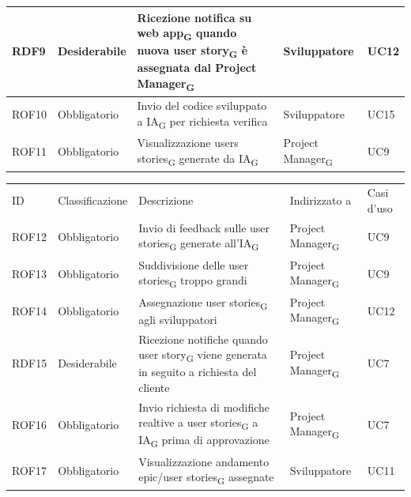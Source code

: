 \documentclass{article}
\begin{document}
\begin{center}
\begin{tabular}{|p{2cm}|p{3cm}|p{6cm}|p{3cm}|p{2cm}|}
RDF9&Desiderabile & Ricezione notifica su web app\textsubscript{G} quando nuova user story\textsubscript{G} è assegnata dal Project Manager\textsubscript{G}& Sviluppatore & UC12\\
\hline
\rowcolor{LighterBlue}
ROF10&Obbligatorio & Invio del codice sviluppato a IA\textsubscript{G} per richiesta verifica& Sviluppatore & UC15\\

\hline
\rowcolor{LightBlue}

ROF11&Obbligatorio & Visualizzazione users stories\textsubscript{G} generate da IA\textsubscript{G}  & Project Manager\textsubscript{G} & UC9\\
\hline


\end{tabular}

    \begin{tabular}{|p{2cm}|p{3cm}|p{6cm}|p{3cm}|p{2cm}|}
    \rowcolor{Blue} 
\hline
ID & Classificazione & Descrizione & Indirizzato a&Casi d'uso  \\ 
\rowcolor{LightBlue}
\hline
ROF12&Obbligatorio & Invio di feedback sulle user stories\textsubscript{G} generate all'IA\textsubscript{G}& Project Manager\textsubscript{G}&UC9\\
\hline
\rowcolor{LighterBlue}

ROF13&Obbligatorio & Suddivisione delle user stories\textsubscript{G} troppo grandi  & Project Manager\textsubscript{G}& UC9\\
\hline
\rowcolor{LightBlue}

ROF14&Obbligatorio & Assegnazione user stories\textsubscript{G} agli sviluppatori& Project Manager\textsubscript{G}& UC12\\
\hline
\rowcolor{LighterBlue}

RDF15&Desiderabile & Ricezione notifiche quando user story\textsubscript{G} viene generata in seguito a richiesta del cliente & Project Manager\textsubscript{G} & UC7\\
\hline
\rowcolor{LightBlue}

ROF16&Obbligatorio & Invio richiesta di modifiche realtive a user stories\textsubscript{G} a IA\textsubscript{G} prima di approvazione& Project Manager\textsubscript{G}& UC7\\
\hline
\rowcolor{LighterBlue}

ROF17&Obbligatorio & Visualizzazione andamento epic/user stories\textsubscript{G} assegnate& Sviluppatore& UC11\\

\hline

\end{tabular}
\label{tab:reqfunz}
\end{center}
\end{document}
